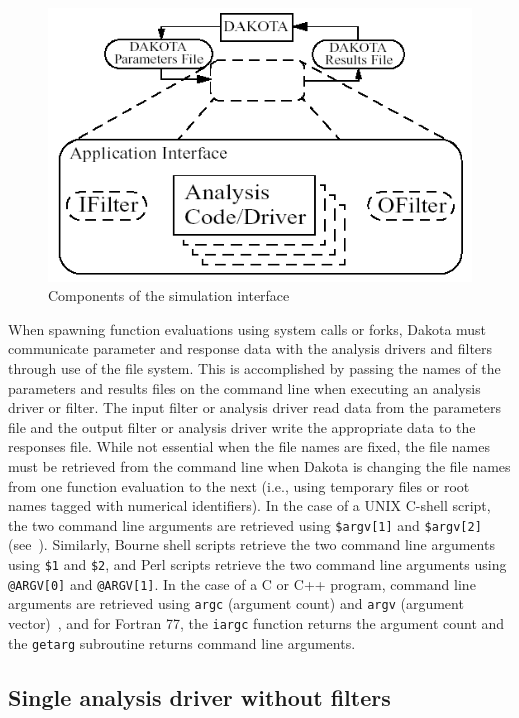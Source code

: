 \begin{figure}
  \centering
  \includegraphics[scale=0.8]{images/dakota_components}
  \caption{Components of the simulation interface}
  \label{interfaces:bbinterfacecomp}
\end{figure}

When spawning function evaluations using system calls or forks, Dakota
must communicate parameter and response data with the analysis drivers
and filters through use of the file system. This is accomplished by
passing the names of the parameters and results files on the command
line when executing an analysis driver or filter. The input filter or
analysis driver read data from the parameters file and the output
filter or analysis driver write the appropriate data to the responses
file. While not essential when the file names are fixed, the file
names must be retrieved from the command line when Dakota is changing
the file names from one function evaluation to the next (i.e., using
temporary files or root names tagged with numerical identifiers).
In the case of a UNIX C-shell script, the two command line arguments
are retrieved using \texttt{\$argv[1]} and \texttt{\$argv[2]}
(see~\cite{And86}).  Similarly, Bourne shell scripts retrieve the two
command line arguments using \texttt{\$1} and \texttt{\$2}, and Perl
scripts retrieve the two command line arguments using
\texttt{@ARGV[0]} and \texttt{@ARGV[1]}.  In the case of a C or C++
program, command line arguments are retrieved using \texttt{argc}
(argument count) and \texttt{argv} (argument vector)~\cite{Ker88}, and
for Fortran 77, the \texttt{iargc} function returns the argument count
and the \texttt{getarg} subroutine returns command line arguments.

\subsection{Single analysis driver without filters}\label{interfaces:components:single1}

